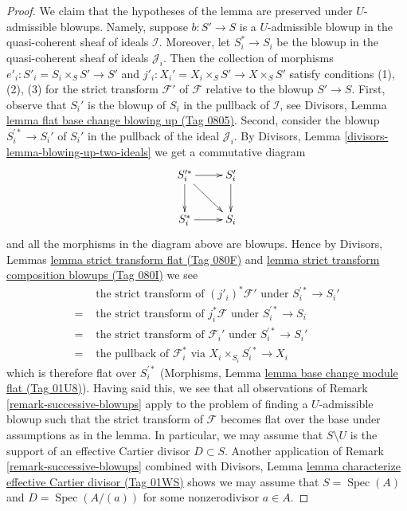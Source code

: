 \documentclass{amsart}
\theoremstyle{plain}
\theoremstyle{definition}
\theoremstyle{remark}
\numberwithin{equation}{subsection}
\def\Spec{\mathop{\mathrm{Spec}}}
\begin{document}
\begin{proof}
We claim that the hypotheses of the lemma are preserved under $U$-admissible
blowups. Namely, suppose $b : S' \to S$ is a $U$-admissible blowup in
the quasi-coherent sheaf of ideals $\mathcal{I}$. Moreover, let $S^*_i \to S_i$
be the blowup in the quasi-coherent sheaf of ideals $\mathcal{J}_i$.
Then the collection of morphisms $e'_i : S'_i = S_i \times_S S' \to S'$
and $j'_i : X_i' = X_i \times_S S' \to X \times_S S'$ satisfy conditions
(1), (2), (3) for the strict transform $\mathcal{F}'$ of $\mathcal{F}$
relative to the blowup $S' \to S$. First, observe that $S_i'$ is the
blowup of $S_i$ in the pullback of $\mathcal{I}$, see
Divisors, Lemma \href{https://stacks.math.columbia.edu/tag/0805}{lemma flat base change blowing up (Tag 0805)}.
Second, consider the blowup
$S_i^{\prime *} \to S_i'$ of $S_i'$ in the pullback of the ideal
$\mathcal{J}_i$.
By Divisors, Lemma \ref{divisors-lemma-blowing-up-two-ideals}
we get a commutative diagram
$$
\xymatrix{
S_i^{\prime *} \ar[r] \ar[rd] \ar[d] & S'_i \ar[d] \\
S_i^* \ar[r] & S_i
}
$$
and all the morphisms in the diagram above are blowups. Hence by
Divisors, Lemmas \href{https://stacks.math.columbia.edu/tag/080F}{lemma strict transform flat (Tag 080F)} and
\href{https://stacks.math.columbia.edu/tag/080I}{lemma strict transform composition blowups (Tag 080I)}
we see
\begin{align*}
& \text{ the strict transform of }(j'_i)^*\mathcal{F}'\text{ under }
S_i^{\prime *} \to S_i' \\
= &
\text{ the strict transform of }j_i^*\mathcal{F}\text{ under }
S_i^{\prime *} \to S_i \\
= &
\text{ the strict transform of }\mathcal{F}_i'\text{ under }
S_i^{\prime *} \to S_i' \\
= &
\text{ the pullback of }\mathcal{F}_i^*\text{ via }
X_i \times_{S_i} S_i^{\prime *} \to X_i
\end{align*}
which is therefore flat over $S_i^{\prime *}$
(Morphisms, Lemma \href{https://stacks.math.columbia.edu/tag/01U8}{lemma base change module flat (Tag 01U8)}).
Having said this, we see that all observations of
Remark \ref{remark-successive-blowups} apply to the
problem of finding a $U$-admissible blowup such that the
strict transform of $\mathcal{F}$ becomes flat over the base
under assumptions as in the lemma. In particular, we may assume
that $S \setminus U$ is the support of an effective Cartier divisor
$D \subset S$. Another application of Remark \ref{remark-successive-blowups}
combined with
Divisors, Lemma \href{https://stacks.math.columbia.edu/tag/01WS}{lemma characterize effective Cartier divisor (Tag 01WS)}
shows we may assume that $S = \Spec(A)$ and $D = \Spec(A/(a))$
for some nonzerodivisor $a \in A$.


\end{proof}
\end{document}

